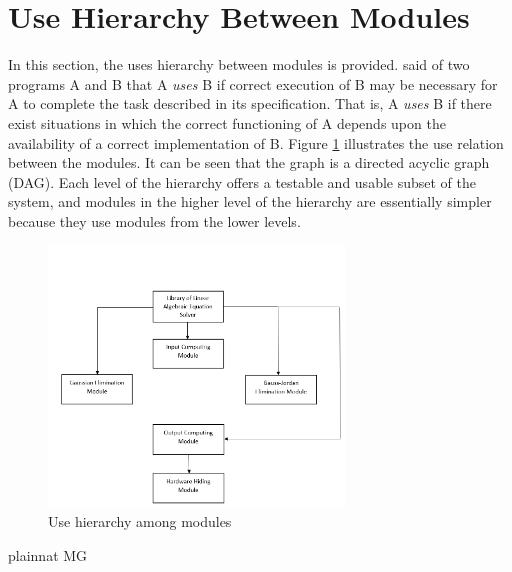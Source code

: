 \documentclass[12pt, titlepage]{article}
\begin{document}
\section{Use Hierarchy Between Modules} \label{SecUse}

In this section, the uses hierarchy between modules is
provided. \citet{Parnas1978} said of two programs A and B that A {\em uses} B if
correct execution of B may be necessary for A to complete the task described in
its specification. That is, A {\em uses} B if there exist situations in which
the correct functioning of A depends upon the availability of a correct
implementation of B.  Figure \ref{FigUH} illustrates the use relation between
the modules. It can be seen that the graph is a directed acyclic graph
(DAG). Each level of the hierarchy offers a testable and usable subset of the
system, and modules in the higher level of the hierarchy are essentially simpler
because they use modules from the lower levels.

\begin{figure}[H]
\centering
\includegraphics[width=0.7\textwidth]{UsesHierarchy.PNG}
\caption{Use hierarchy among modules}
\label{FigUH}
\end{figure}


 {plainnat}
 {MG}
\end{document}

